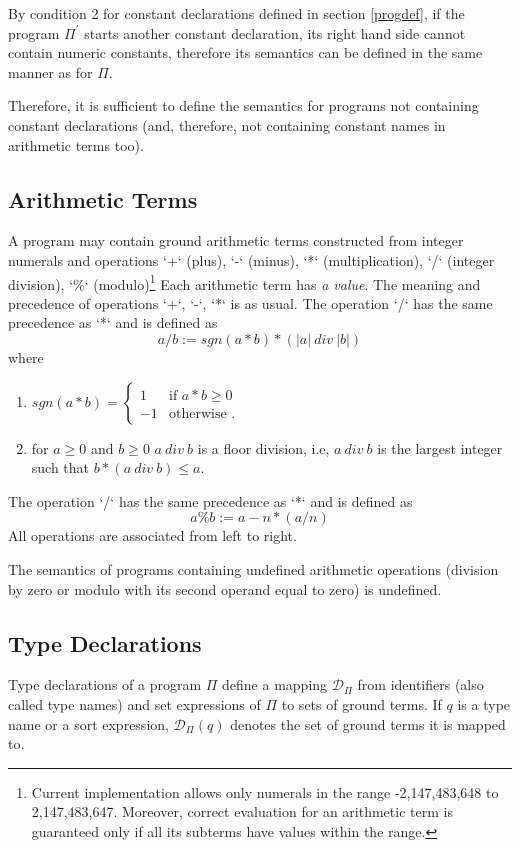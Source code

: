 \documentclass[a4paper,10pt]{article}
\begin{document}
\medskip\noindent
By condition 2 for constant declarations defined in section \ref{progdef}, if the program $\Pi^\prime$ starts another constant declaration, its right hand side cannot contain numeric constants, therefore its semantics can be defined in the same manner as for $\Pi$.
 
\medskip\noindent
Therefore, it is sufficient to define the semantics for programs not containing constant declarations (and, therefore, not containing constant names in arithmetic terms too).

\subsection{Arithmetic Terms}\label{at}

A program may contain ground arithmetic terms constructed from integer numerals and operations `+` (plus),  `-` (minus), `*` (multiplication), `/` (integer division), `\%` (modulo)\footnote{Current implementation allows only numerals in the range -2,147,483,648 to 2,147,483,647. Moreover, correct evaluation for an arithmetic term is guaranteed only if all its subterms have values within the range.} Each arithmetic term  has \textit{a value}. 
The meaning and precedence of operations  `+`,  `-`, `*` is as usual. The  operation `/` has the same precedence as `*` and is defined as $$a/b := sgn(a*b) *(|a|~div~|b|)$$
where 
\begin{enumerate}
\item $sgn(a*b) = \begin{cases} 1 &\mbox{if } a *b \ge 0 \\
-1 & \mbox{otherwise }. \end{cases} $
\item for $a\ge 0$ and $b\ge0$ $a~div~b$ is a floor division, i.e, $a~div~b$ is the largest integer such that $b * (a~div~b)  \le  a$.
\end{enumerate}
The  operation `/` has the same precedence as `*` and is defined as $$a\%b := a - n * (a/n) $$
All operations are associated from left to right. 


\medskip\noindent
The semantics of programs containing undefined arithmetic operations (division by zero or modulo with its second operand equal to zero) is undefined.  

  


\subsection{Type Declarations} \label{types}
Type declarations of a program $\Pi$  define a mapping $\mathcal{D}_\Pi$ from identifiers (also called type names) and set expressions of $\Pi$  to sets of ground terms. If $q$ is a type name or a sort expression, $\mathcal{D}_\Pi(q)$  denotes the set of ground terms it is mapped to. 
\end{document}
